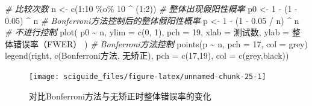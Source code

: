 \documentclass[]{tufte-book}
\newenvironment{Shaded}{}{}
\newcommand{\AttributeTok}[1]{\textcolor[rgb]{0.49,0.56,0.16}{#1}}
\newcommand{\CommentTok}[1]{\textcolor[rgb]{0.38,0.63,0.69}{\textit{#1}}}
\newcommand{\DecValTok}[1]{\textcolor[rgb]{0.25,0.63,0.44}{#1}}
\newcommand{\FloatTok}[1]{\textcolor[rgb]{0.25,0.63,0.44}{#1}}
\newcommand{\FunctionTok}[1]{\textcolor[rgb]{0.02,0.16,0.49}{#1}}
\newcommand{\NormalTok}[1]{#1}
\newcommand{\OtherTok}[1]{\textcolor[rgb]{0.00,0.44,0.13}{#1}}
\newcommand{\SpecialCharTok}[1]{\textcolor[rgb]{0.25,0.44,0.63}{#1}}
\newcommand{\StringTok}[1]{\textcolor[rgb]{0.25,0.44,0.63}{#1}}
\begin{document}
\begin{Shaded}
\begin{Highlighting}[]
\CommentTok{\# 比较次数}
\NormalTok{n }\OtherTok{\textless{}{-}} \FunctionTok{c}\NormalTok{(}\DecValTok{1}\SpecialCharTok{:}\DecValTok{10} \SpecialCharTok{\%o\%} \DecValTok{10} \SpecialCharTok{\^{}}\NormalTok{ (}\DecValTok{1}\SpecialCharTok{:}\DecValTok{2}\NormalTok{))}
\CommentTok{\# 整体出现假阳性概率}
\NormalTok{p0 }\OtherTok{\textless{}{-}} \DecValTok{1} \SpecialCharTok{{-}}\NormalTok{ (}\DecValTok{1} \SpecialCharTok{{-}} \FloatTok{0.05}\NormalTok{) }\SpecialCharTok{\^{}}\NormalTok{ n}
\CommentTok{\# Bonferroni方法控制后的整体假阳性概率}
\NormalTok{p }\OtherTok{\textless{}{-}} \DecValTok{1} \SpecialCharTok{{-}}\NormalTok{ (}\DecValTok{1} \SpecialCharTok{{-}} \FloatTok{0.05} \SpecialCharTok{/}\NormalTok{ n) }\SpecialCharTok{\^{}}\NormalTok{ n}
\CommentTok{\# 不进行控制}
\FunctionTok{plot}\NormalTok{(}
\NormalTok{  p0 }\SpecialCharTok{\textasciitilde{}}\NormalTok{ n,}
  \AttributeTok{ylim =} \FunctionTok{c}\NormalTok{(}\DecValTok{0}\NormalTok{, }\DecValTok{1}\NormalTok{),}
  \AttributeTok{pch =} \DecValTok{19}\NormalTok{,}
  \AttributeTok{xlab =} \StringTok{\textquotesingle{}测试数\textquotesingle{}}\NormalTok{,}
  \AttributeTok{ylab =} \StringTok{\textquotesingle{}整体错误率（FWER）\textquotesingle{}}
\NormalTok{)}
\CommentTok{\# Bonferroni方法控制}
\FunctionTok{points}\NormalTok{(p }\SpecialCharTok{\textasciitilde{}}\NormalTok{ n, }\AttributeTok{pch =} \DecValTok{17}\NormalTok{, }\AttributeTok{col =} \StringTok{\textquotesingle{}grey\textquotesingle{}}\NormalTok{)}
\FunctionTok{legend}\NormalTok{(}\StringTok{\textquotesingle{}right\textquotesingle{}}\NormalTok{,}
       \FunctionTok{c}\NormalTok{(}\StringTok{\textquotesingle{}Bonferroni方法\textquotesingle{}}\NormalTok{, }\StringTok{\textquotesingle{}无矫正\textquotesingle{}}\NormalTok{),}
       \AttributeTok{pch =} \FunctionTok{c}\NormalTok{(}\DecValTok{17}\NormalTok{,}\DecValTok{19}\NormalTok{),}
       \AttributeTok{col =} \FunctionTok{c}\NormalTok{(}\StringTok{\textquotesingle{}grey\textquotesingle{}}\NormalTok{,}\StringTok{\textquotesingle{}black\textquotesingle{}}\NormalTok{))}
\end{Highlighting}
\end{Shaded}

\begin{figure}
\texttt{[image: sciguide\_files/figure-latex/unnamed-chunk-25-1]} \caption[对比Bonferroni方法与无矫正时整体错误率的变化]{对比Bonferroni方法与无矫正时整体错误率的变化}\label{fig:unnamed-chunk-25}
\end{figure}
\end{document}
